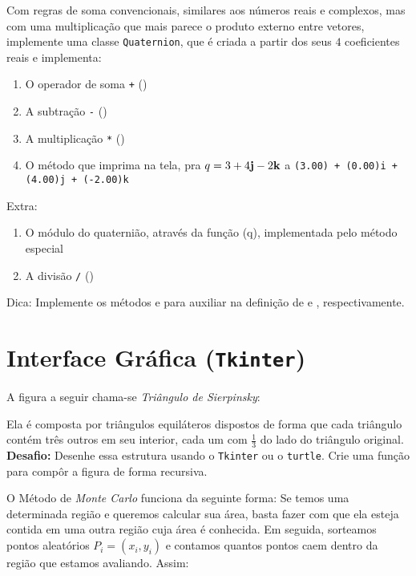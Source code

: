 \documentclass[12pt]{article}
\begin{document}
	Com regras de soma convencionais, similares aos números reais e complexos, mas com uma multiplicação que mais parece o produto externo entre vetores, implemente uma classe \texttt{Quaternion}, que é criada a partir dos seus $4$ coeficientes reais e implementa:
	\begin{enumerate}
		\item O operador de soma \texttt{+} ()
		\item A subtração \texttt{-} ()
		\item A multiplicação \texttt{*} ()
		\item O método  que imprima na tela, pra $q = 3 + 4\mathbf{j} - 2\mathbf{k}$ a  \texttt{(3.00) + (0.00)i + (4.00)j + (-2.00)k}
	\end{enumerate}
	
	Extra:
	\begin{enumerate}
		\item O módulo do quaternião, através da função (q), implementada pelo método especial 
		\item A divisão \texttt{\slash} ()
	\end{enumerate}

	Dica:
	Implemente os métodos  e  para auxiliar na definição de  e , respectivamente.
	
	\section{Interface Gráfica (\texttt{Tkinter})}
	
		
	
	A figura a seguir chama-se \emph{Triângulo de Sierpinsky}:
	

	Ela é composta por triângulos equiláteros dispostos de forma que cada triângulo contém três outros em seu interior, cada um com $\frac{1}{3}$ do lado do triângulo original.\\
	
	\textbf{Desafio:} Desenhe essa estrutura usando o \texttt{Tkinter} ou o \texttt{turtle}. Crie uma função para compôr a figura de forma recursiva.

	
	O Método de \emph{Monte Carlo} funciona da seguinte forma: Se temos uma determinada região e queremos calcular sua área, basta fazer com que ela esteja contida em uma outra região cuja área é conhecida. Em seguida, sorteamos pontos aleatórios $P_{i} = (x_{i}, y_{i})$ e contamos quantos pontos caem dentro da região que estamos avaliando. Assim:
	
\end{document}

